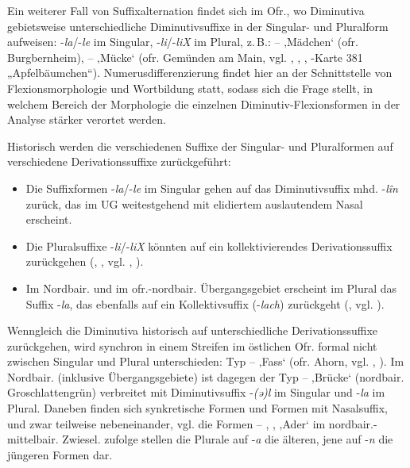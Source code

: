 Ein weiterer Fall von Suffixalternation findet sich im Ofr., wo Diminutiva gebietsweise unterschiedliche Diminutivsuffixe in der Singular- und Pluralform aufweisen: -\textit{la}/-\textit{le} im Singular, -\textit{li}/-\textit{liX} im Plural, z.\,B.:  --  ‚Mädchen‘ (ofr. Burgbernheim),  --  ‚Mücke‘ (ofr. Gemünden am Main, vgl. \citealt[Karte 34]{Rowley1997}, \citealt[22--23 und Karte 45]{SMF7}, \citealt[Karte 54]{SUF3}, \citealt{WA}-Karte 381 „Apfelbäumchen“). Numerusdifferenzierung findet hier an der Schnittstelle von Flexionsmorphologie und Wortbildung statt, sodass sich die Frage stellt, in welchem Bereich der Morphologie die einzelnen Diminutiv-Flexionsformen in der Analyse stärker verortet werden.

Historisch werden die verschiedenen Suffixe der Singular- und Pluralformen auf verschiedene Derivationssuffixe zurückgeführt:

\begin{itemize}
\item Die Suffixformen -\textit{la}/-\textit{le} im Singular gehen auf das Diminutivsuffix mhd. -\textit{lîn} zurück, das im UG weitestgehend mit elidiertem auslautendem Nasal erscheint.
\item Die Pluralsuffixe -\textit{li}/-\textit{liX} könnten auf ein kollektivierendes Derivationssuffix zurückgehen (\citealt[§596--606]{Schmeller1821}, \citealt[112]{Wrede1908}, vgl. \citealt[24--25]{Rowley1994}, \citealt[194--195]{SMF7}).
\item Im Nordbair. und im ofr.-nordbair. Übergangsgebiet erscheint im Plural das Suffix -\textit{la}, das ebenfalls auf ein Kollektivsuffix (-\textit{lach}) zurückgeht (\citealt[22--24]{Rowley1994}, vgl. \citealt[1253]{Seebold1983}).
\end{itemize}

Wenngleich die Diminutiva historisch auf unterschiedliche Derivationssuffixe zurückgehen, wird synchron in einem Streifen im östlichen Ofr. formal nicht zwischen Singular und Plural unterschieden: Typ   --  ‚Fass‘ (ofr. Ahorn, vgl. \citealt[Karte 33]{Rowley1997}, \citealt[Karten 63.1/2]{Steger1968}). Im Nordbair. (inklusive Übergangsgebiete) ist dagegen der Typ  --  ‚Brücke‘ (nordbair. Groschlattengrün) verbreitet mit Diminutivsuffix -\textit{(ə)l} im Singular und -\textit{la} im Plural. Daneben finden sich synkretische Formen und Formen mit Nasalsuffix, und zwar teilweise nebeneinander, vgl. die Formen  -- , ,  ‚Ader‘ im nordbair.-mittelbair. Zwiesel. \citet[136]{Rowley1997} zufolge stellen die Plurale auf -\textit{a} die älteren, jene auf -\textit{n} die jüngeren Formen dar.

